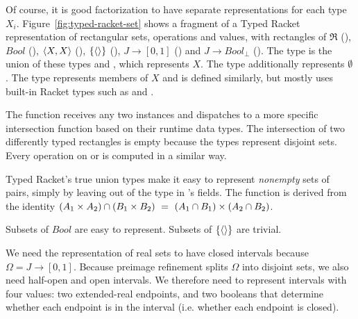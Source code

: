 Of course, it is good factorization to have separate representations for each type $X_i$.
Figure~\ref{fig:typed-racket-set} shows a fragment of a Typed Racket representation of rectangular sets, operations and values, with rectangles of $\Re$ (), $Bool$ (), $\langle{X,X}\rangle$ (), $\{{\langle{}\rangle}\}$ (), $J \to [0,1]$ () and $J \to Bool_\bot$ ().
The type  is the union of these types and , which represents $X$.
The  type additionally represents $\emptyset$.
The  type represents members of $X$ and is defined similarly, but mostly uses built-in Racket types such as  and .

The  function receives any two  instances and dispatches to a more specific intersection function based on their runtime data types.
The intersection of two differently typed rectangles is empty because the types represent disjoint sets.
Every operation on  or  is computed in a similar way.

Typed Racket's true union types make it easy to represent \emph{nonempty} sets of pairs, simply by leaving  out of the type in 's fields.
The  function is derived from the identity $(A_1 \times A_2) \cap (B_1 \times B_2)\ =\ (A_1 \cap B_1) \times (A_2 \cap B_2)$.

Subsets of $Bool$ are easy to represent.
Subsets of $\{{\langle{}\rangle}\}$ are trivial.

We need the representation of real sets to have closed intervals because $\Omega = J \to [0,1]$.
Because preimage refinement splits $\Omega$ into disjoint sets, we also need half-open and open intervals.
We therefore need to represent intervals with four values: two extended-real endpoints, and two booleans that determine whether each endpoint is in the interval (i.e. whether each endpoint is closed).

